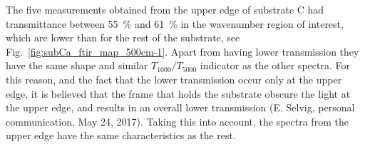 The five measurements obtained from the upper edge of substrate C had transmittance between \SI{55}{\percent} and \SI{61}{\percent} in the wavenumber region of interest, which are lower than for the rest of the substrate, see Fig.~\ref{fig:subCa_ftir_map_500cm-1}. Apart from having lower transmission they have the same shape and similar $T_{1000}/T_{5000}$ indicator as the other spectra. For this reason, and the fact that the lower transmission occur only at the upper edge, it is believed that the frame that holds the substrate obscure the light at the upper edge, and results in an overall lower transmission (E. Selvig, personal communication, May 24, 2017). Taking this into account, the spectra from the upper edge have the same characteristics as the rest.



